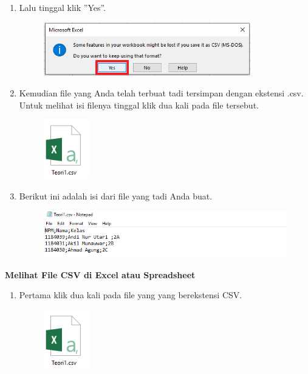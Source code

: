 \begin{enumerate}
\begin{enumerate}
		\item Lalu tinggal klik ''Yes''.
			\begin{figure}[!htbp]
			\includegraphics[width=9cm]{figures/t6.png}
			\centering
		\end{figure}
		
		\item Kemudian file yang Anda telah terbuat tadi tersimpan dengan ekstensi .csv. Untuk melihat isi filenya tinggal klik dua kali pada file tersebut.
		
		\begin{figure}[!htbp]
			\includegraphics[width=2cm]{figures/a5.png}
			\centering
		\end{figure}
		
		\item Berikut ini adalah isi dari file yang tadi Anda buat.
		
		\begin{figure}[!htbp]
			\includegraphics[width=12cm]{figures/a6.PNG}
			\centering
		\end{figure}
	\end{enumerate}
	
	\newpage
	\textbf{Melihat File CSV di Excel atau Spreadsheet}
	
	\begin{enumerate}
		\item Pertama klik dua kali pada file yang yang berekstensi CSV.
		
		\begin{figure}[!htbp]
			\includegraphics[width=2cm]{figures/a5.PNG}
			\centering
		\end{figure}
		

\end{enumerate}
\end{enumerate}
